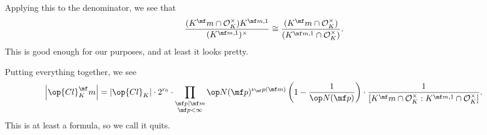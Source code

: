 Applying this to the denominator, we see that
\[\frac{(K^\mf m\cap\mathcal O_K^\times)K^{\mf m,1}}{(K^{\mf m,1})^\times}\cong\frac{(K^\mf m\cap\mathcal O_K^\times)}{(K^{\mf m,1}\cap\mathcal O_K^\times)}.\]
This is good enough for our purposes, and at least it looks pretty.

Putting everything together, we see
\[\left|\op{Cl}_K^\mf m\right|=\left|\op{Cl}_K\right|\cdot2^{r_0}\cdot\prod_{\substack{\mf p\mid\mf m\\\mf p<\infty}}\op N(\mf p)^{\nu_\mf p(\mf m)}\left(1-\frac1{\op N(\mf p)}\right)\cdot\frac1{[K^\mf m\cap\mathcal O_K^\times:K^{\mf m,1}\cap\mathcal O_K^\times]}.\]
This is at least a formula, so we call it quits.
